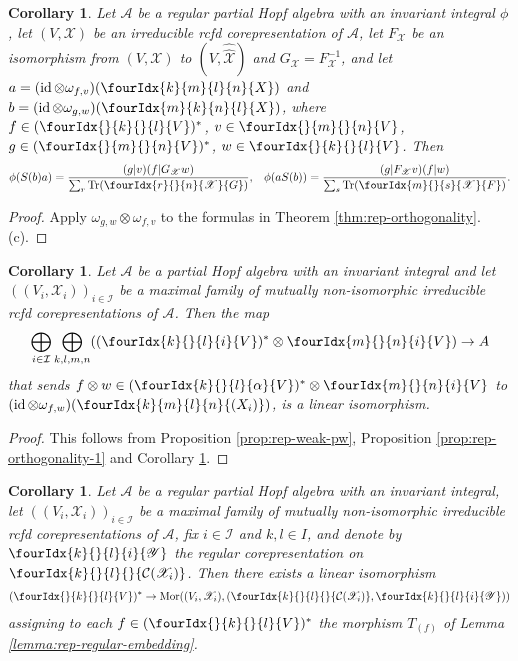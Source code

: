 \documentclass[11pt]{article}
\DeclareMathOperator{\id}{id}
\newcommand{\dual}[1]{#1^{*}}
\newcommand{\dualco}[1]{\hat{#1}}
\newcommand{\Tr}{\mathrm{Tr}}
\newcommand{\Mor}{\mathrm{Mor}}
\newcommand{\Gr}[5]{\fourIdx{#2}{#4}{#3}{#5}{#1}}%
\newcommand{\Gru}[3]{\Gr{#1}{}{}{#2}{#3}}
\newcommand{\Grd}[3]{\Gr{#1}{#2}{#3}{}{}}
\newtheorem{Cor}[Theorem]{Corollary}
\theoremstyle{definition}
\numberwithin{equation}{section}
\begin{document}
\begin{Cor}\label{CorOrth}
  Let $\mathscr{A}$ be a regular partial Hopf algebra with an invariant integral $\phi$, let
  $(V,\mathscr{X})$ be an irreducible rcfd corepresentation of
  $\mathscr{A}$, let $F_{\mathscr{X}}$ be an isomorphism from
  $(V,\mathscr{X})$ to $(V,\dualco{\dualco{\mathscr{X}}})$ and
  $G_{\mathscr{X}}=F^{-1}_{{\mathscr{X}}}$, and let $a=(\id \otimes
  \omega_{f,v})(\Gr{X}{k}{l}{m}{n})$ and $b=(\id \otimes
  \omega_{g,w})(\Gr{X}{m}{n}{k}{l})$, where 
  $f \in   \dual{(\Gru{V}{k}{l})}$, $v \in\Gru{V}{m}{n}$, $g \in
  \dual{(\Gru{V}{m}{n})}$, $w \in  \Gru{V}{k}{l}$.  Then
\begin{align*}
  \phi(S(b)a) &= \frac{(g|v)(f|G_{\mathscr{X}}w)}{\sum_{r}
    \Tr(\Gr{G}{r}{n}{}{\mathscr{X}})}, & \phi(aS(b)) = \frac{(g|F_{\mathscr{X}}v)(f|w)}{\sum_{s}
    \Tr(\Gr{F}{m}{s}{}{\mathscr{X}})}.
\end{align*}
\end{Cor}
\begin{proof}
Apply $\omega_{g,w} \otimes
    \omega_{f,v}$ to the formulas in  Theorem
    \ref{thm:rep-orthogonality}.(c).
\end{proof}
\begin{Cor} \label{cor:rep-pw}
  Let $\mathscr{A}$ be a partial Hopf algebra with an invariant integral and let
  $((V_{i},\mathscr{X}_{i}))_{i \in \mathcal{I}}$ be a maximal family of mutually non-isomorphic irreducible rcfd corepresentations of
  $\mathscr{A}$. Then the map
  \begin{align*}
    \bigoplus_{i \in \mathcal{I}} \bigoplus_{k,l,m,n}
    (\dual{(\Gr{V}{k}{l}{}{i})} \otimes
    \Gr{V}{m}{n}{}{i}) \to A
  \end{align*}
  that sends $f \otimes w \in
  \dual{(\Gr{V}{k}{l}{}{\alpha})} \otimes
  \Gr{V}{m}{n}{}{i}$ to $ (\id \otimes
  \omega_{f,w})(\Gr{(X_{i})}{k}{l}{m}{n})$,
  is a linear isomorphism. 
\end{Cor}
\begin{proof} This follows from Proposition \ref{prop:rep-weak-pw}, Proposition \ref{prop:rep-orthogonality-1} and Corollary \ref{CorOrth}.
\end{proof}
\begin{Cor} \label{cor:rep-pw-morphisms}
  Let $\mathscr{A}$ be a regular partial Hopf algebra with an invariant integral, let
  $((V_{i},\mathscr{X}_{i}))_{i\in \mathcal{I}}$ be a maximal
  family of mutually non-isomorphic irreducible rcfd corepresentations of $\mathscr{A}$,
  fix $i \in \mathcal{I}$ and $k,l\in I$, and denote by $\Gr{\mathscr{Y}}{k}{l}{}{i}$
  the regular corepresentation on
  $\Grd{\mathcal{C}(\mathscr{X}_i)}{k}{l}$. Then there exists a
  linear isomorphism
  \begin{align*}
    \dual{( \Gru{V}{k}{l})} \to
    \Mor((V_{i},\mathscr{X}_{i}),
    (\Grd{\mathcal{C}(\mathscr{X}_i)}{k}{l},\Gr{\mathscr{Y}}{k}{l}{}{i}))
  \end{align*}
  assigning to each $f\in     \dual{( \Gru{V}{k}{l})}$ the morphism
  $T_{(f)}$ of Lemma \ref{lemma:rep-regular-embedding}.
\end{Cor}
\end{document}
